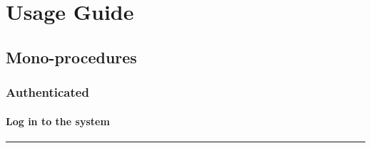 \chapter{Usage Guide}
\label{chap:usage_guide}


\section{Mono-procedures}


\subsection{Authenticated}

\subsubsection{Log in to the system}
\vspace{0.5cm}
\hrule
